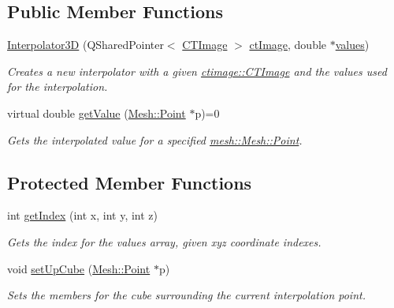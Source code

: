 \subsection*{Public Member Functions}
\begin{DoxyCompactItemize}
\item 
\hyperlink{classassignment_1_1_interpolator3_d_a54645d60de51db0881e97c085e0a4c75}{Interpolator3D} (QSharedPointer$<$ \hyperlink{classctimage_1_1_c_t_image}{CTImage} $>$ \hyperlink{classassignment_1_1_interpolator3_d_a7a9b457f60bd12527e0402fcab391bf3}{ctImage}, double $\ast$\hyperlink{classassignment_1_1_interpolator3_d_a061525dc9657ecd0aac93d647398e01f}{values})
\begin{DoxyCompactList}\small\item\em Creates a new interpolator with a given \hyperlink{classctimage_1_1_c_t_image}{ctimage::CTImage} and the values used for the interpolation. \item\end{DoxyCompactList}\item 
virtual double \hyperlink{classassignment_1_1_interpolator3_d_ac6ed5447418b7980d5ad2f12e853b35f}{getValue} (\hyperlink{structmesh_1_1_mesh_1_1_point}{Mesh::Point} $\ast$p)=0
\begin{DoxyCompactList}\small\item\em Gets the interpolated value for a specified \hyperlink{structmesh_1_1_mesh_1_1_point}{mesh::Mesh::Point}. \item\end{DoxyCompactList}\end{DoxyCompactItemize}
\subsection*{Protected Member Functions}
\begin{DoxyCompactItemize}
\item 
int \hyperlink{classassignment_1_1_interpolator3_d_a2fd5d0ea20ee345a485d6b6aba546bf7}{getIndex} (int x, int y, int z)
\begin{DoxyCompactList}\small\item\em Gets the index for the values array, given xyz coordinate indexes. \item\end{DoxyCompactList}\item 
void \hyperlink{classassignment_1_1_interpolator3_d_a7f1152d0026def40f616d2c8c33844fd}{setUpCube} (\hyperlink{structmesh_1_1_mesh_1_1_point}{Mesh::Point} $\ast$p)
\begin{DoxyCompactList}\small\item\em Sets the members for the cube surrounding the current interpolation point. \item\end{DoxyCompactList}\end{DoxyCompactItemize}
